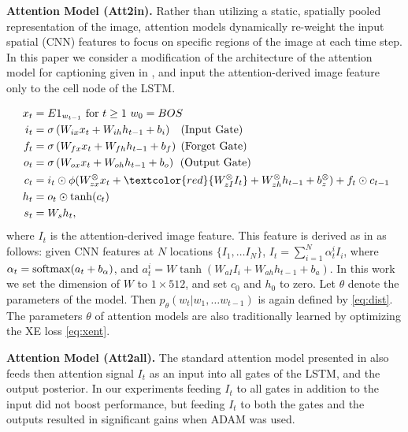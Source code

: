 \documentclass[10pt,twocolumn,letterpaper]{article}
\begin{document}
\noindent \textbf{Attention Model (Att2in).} Rather than utilizing a static, spatially pooled representation of the image, attention models dynamically re-weight the input spatial (CNN) features to focus on specific regions of the image at each time step. In this paper we consider a modification of the architecture of the attention model for captioning given in \cite{CapAttention}, and input the attention-derived image feature only to the cell node of the LSTM. 

\vspace{-0.1in}
\begin{align*}
x_{t}&=E 1_{w_{t-1}} \text{ for } t \geq 1~ w_0=BOS \\
i_{t}&= \sigma\left(W_{ix} x_{t}+W_{ih}h_{t-1}+ b_{i}\right)\;\;\;(\text {Input Gate})\\
f_{t}&=\sigma\left(W_{fx} x_{t}+W_{fh}h_{t-1}+ b_{f}\right)\; (\text {Forget Gate})\\\
o_{t}&=\sigma\left(W_{ox} x_{t}+W_{oh}h_{t-1}+ b_{o}\right)\;\,(\text {Output Gate})\\
c_{t}&= i_{t}\odot \phi(W_{zx}^{\otimes} x_{t}+\textcolor{red}{W_{zI}^{\otimes} I_{t}}+W_{zh}^{\otimes}h_{t-1}+ b_{z}^{\otimes})+ f_{t}\odot c_{t-1} \\
h_t &= o_t \odot \tanh(c_{t}) \\
s_{t}&= W_{s} h_{t},
\vspace{-0.2in} 
\end{align*}
where $I_{t}$ is the attention-derived image feature. This feature is derived as in \cite{CapAttention} as follows: given CNN features at $N$ locations $\{I_1,\dots I_{N}\}$, $I_{t}=\sum_{i=1}^N \alpha^i_t I_{i}$, where $\alpha_{t}={\rm softmax}(a_{t} + b_{\alpha})$, and $a^{i}_{t}=W\tanh(W_{aI}I_{i}+W_{ah}h_{t-1}+b_{a})$. In this work we set the dimension of $W$ to $1\times512$, and set $c_0$ and $h_0$ to zero. Let $\theta$ denote the parameters of the model. Then $p_{\theta}(w_t|w_1,\dots w_{t-1})$ is again defined by \eqref{eq:dist}. The parameters $\theta$ of attention models are also traditionally learned by optimizing the XE loss  \eqref{eq:xent}. 

\noindent \textbf{Attention Model (Att2all).} The standard attention model presented in \cite{CapAttention} also feeds then attention signal $I_{t}$ as an input into all gates of the LSTM, and the output posterior. In our experiments feeding  $I_{t}$ to all gates in addition to the input did not boost performance, but feeding  $I_{t}$ to both the gates and the outputs resulted in significant gains when ADAM \cite{ADAM} was used.
\end{document}
